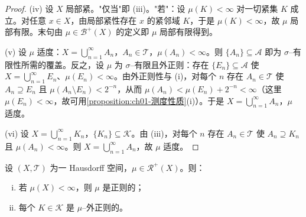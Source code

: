 \documentclass[../../main.tex]{subfiles}%
\begin{document}
\begin{proof}
(iv) 设 $X$ 局部紧。"仅当"即 (iii)。"若"：设 $\mu(K)<\infty$ 对一切紧集 $K$ 成立。对任意 $x\in X$，由局部紧性存在 $x$ 的紧邻域 $K$，于是 $\mu(K)<\infty$，故 $\mu$ 局部有限。末句由 $\mu\in\mathcal{B}^+(X)$ 的定义即 $\mu$ 局部有限得到。

(v) 设 $\mu$ 适度：$X=\bigcup_{n=1}^\infty A_n$，$A_n\in\mathcal{T}$，$\mu(A_n)<\infty$。则 $\{A_n\}\subseteq\mathcal{A}$ 即为 $\sigma$--有限性所需的覆盖。反之，设 $\mu$ 为 $\sigma$--有限且外正则：存在 $\{E_n\}\subseteq\mathcal{A}$ 使 $X=\bigcup_{n=1}^\infty E_n$、$\mu(E_n)<\infty$。由外正则性与 (i)，对每个 $n$ 存在 $A_n\in\mathcal{T}$ 使 $A_n\supseteq E_n$ 且 $\mu(A_n\setminus E_n)<2^{-n}$，从而 $\mu(A_n)<\mu(E_n)+2^{-n}<\infty$（这里 $\mu(E_n)<\infty$，故可用\cref{proposition:ch01-测度性质}(i)）。于是 $X=\bigcup_{n=1}^\infty A_n$，$\mu$ 适度。

(vi) 设 $X=\bigcup_{n=1}^\infty K_n$，$\{K_n\}\subseteq\mathcal{K}$。由 (iii)，对每个 $n$ 存在 $A_n\in\mathcal{T}$ 使 $A_n\supseteq K_n$ 且 $\mu(A_n)<\infty$。则 $X=\bigcup_{n=1}^\infty A_n$，故 $\mu$ 适度。
\end{proof}

\begin{lemma}\label{lemma:ch01-有限Radon正则}\label{lemma:ch01-紧外正则}\label{lemma:ch01-正则性}
设 $(X,\mathcal{T})$ 为一 Hausdorff 空间，$\mu\in\mathcal{R}^+(X)$。则：
\begin{enumerate}[(i)]
\item 若 $\mu(X)<\infty$，则 $\mu$ 是正则的；
\item 每个 $K\in\mathcal{K}$ 是 $\mu$--外正则的。
\end{enumerate}
\end{lemma}
\end{document}
